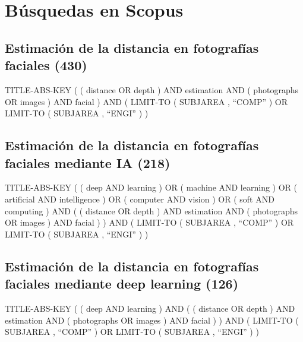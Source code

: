 \section*{Búsquedas en Scopus}

\subsection*{Estimación de la distancia en fotografías faciales (430)}
	
TITLE-ABS-KEY ( ( distance OR depth ) AND estimation AND ( photographs OR images ) AND facial ) AND ( LIMIT-TO ( SUBJAREA , ``COMP'' ) OR LIMIT-TO ( SUBJAREA , ``ENGI'' ) )

\subsection*{Estimación de la distancia en fotografías faciales mediante IA (218)}

TITLE-ABS-KEY ( ( deep AND learning ) OR ( machine AND learning ) OR ( artificial AND intelligence ) OR ( computer AND vision ) OR ( soft AND computing ) AND ( ( distance OR depth ) AND estimation AND ( photographs OR images ) AND facial ) ) AND ( LIMIT-TO ( SUBJAREA , ``COMP'' ) OR LIMIT-TO ( SUBJAREA , ``ENGI'' ) )

\subsection*{Estimación de la distancia en fotografías faciales mediante deep learning (126)}
	
TITLE-ABS-KEY ( ( deep AND learning ) AND ( ( distance OR depth ) AND estimation AND ( photographs OR images ) AND facial ) ) AND ( LIMIT-TO ( SUBJAREA , ``COMP'' ) OR LIMIT-TO ( SUBJAREA , ``ENGI'' ) )
	